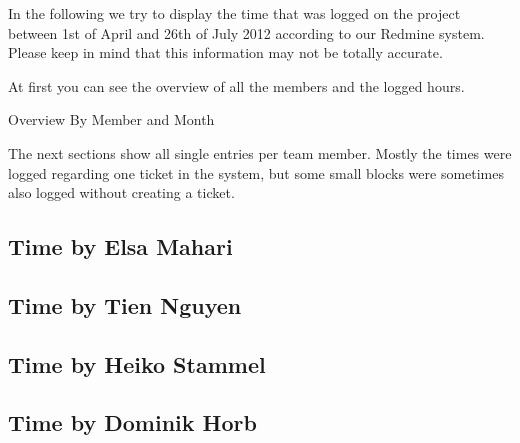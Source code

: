 \begin{appendix}
In the following we try to display the time that was logged on the project between 1st of April and 26th of July 2012 according to our Redmine system. Please keep in mind that this information may not be totally accurate.

At first you can see the overview of all the members and the logged hours.


\begin{table}[htbp]
  \caption{Overview By Member and Month}
  \centering
\end{table}

The next sections show all single entries per team member. Mostly the times were logged regarding one ticket in the system, but some small blocks were sometimes also logged without creating a ticket.

\begin{landscape}
\section{Time by Elsa Mahari}
\end{landscape}

\begin{landscape}
\section{Time by Tien Nguyen}
\end{landscape}

\begin{landscape}
\section{Time by Heiko Stammel}
\end{landscape}

\begin{landscape}
\section{Time by Dominik Horb}


\end{landscape}
\end{appendix}
